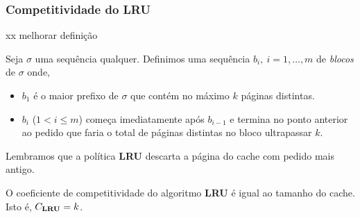 \documentclass[a4paper,oneside,reqno,12pt]{amsart}
\begin{document}
\subsubsection{Competitividade do LRU}

\begin{definition}

  xx melhorar definição

  Seja \(\sigma\) uma sequência qualquer. Definimos uma sequência \(b_i, \ i = 1, \dots, m\) de \emph{blocos} de \(\sigma\) onde,
\begin{itemize}
    \item \(b_1\) é o maior prefixo de \(\sigma\) que contém no máximo \(k\) páginas distintas.
    \item \(b_i\) (\(1 < i \le m\)) começa imediatamente após \(b_{i-1}\) e termina no ponto anterior ao pedido que faria o total de páginas distintas no bloco ultrapassar \(k\). 
\end{itemize}

\end{definition}

Lembramos que a política \textbf{LRU} descarta a página do cache com pedido mais antigo. 

\begin{theorem}
  O coeficiente de competitividade do algoritmo \textbf{LRU} é igual ao tamanho do cache. Isto é, \(C_{\bold{LRU}} = k\).
\end{theorem}
\end{document}
